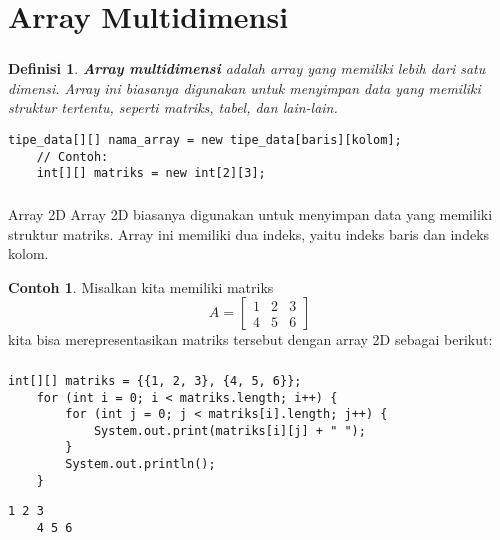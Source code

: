 \documentclass[aspectratio=169]{beamer}
\newtheorem*{definisi}{Definisi}
\theoremstyle{definition}
\newtheorem*{contoh}{Contoh}
\begin{document}
    \section{Array Multidimensi}
    \begin{frame}[fragile]
        \frametitle{\insertsection}
        \begin{definisi}
            \textbf{Array multidimensi} adalah array yang memiliki lebih dari satu dimensi. Array ini biasanya digunakan untuk menyimpan data yang memiliki struktur tertentu, seperti matriks, tabel, dan lain-lain.
        \end{definisi}
        \begin{lstlisting}[caption={Deklarasi array 2D}]
    tipe_data[][] nama_array = new tipe_data[baris][kolom];
    // Contoh:
    int[][] matriks = new int[2][3];
        \end{lstlisting}
    \end{frame}

    \begin{frame}
        \frametitle{\insertsection}
        \begin{block}{Array 2D}
            Array 2D biasanya digunakan untuk menyimpan data yang memiliki struktur matriks. Array ini memiliki dua indeks, yaitu indeks baris dan indeks kolom.
        \end{block}
        \begin{contoh}
            Misalkan kita memiliki matriks \[A = \begin{bmatrix} 1 & 2 & 3 \\ 4 & 5 & 6 \end{bmatrix}\] kita bisa merepresentasikan matriks tersebut dengan array 2D sebagai berikut:
        \end{contoh}
    \end{frame}

    \begin{frame}[fragile]
        \frametitle{\insertsection}
        \begin{lstlisting}[caption={Matriks dengan Array 2D}]
    int[][] matriks = {{1, 2, 3}, {4, 5, 6}};
    for (int i = 0; i < matriks.length; i++) {
        for (int j = 0; j < matriks[i].length; j++) {
            System.out.print(matriks[i][j] + " ");
        }
        System.out.println();
    }
        \end{lstlisting}
        \begin{lstlisting}[style=output]
    1 2 3
    4 5 6
        \end{lstlisting}
    \end{frame}
\end{document}

